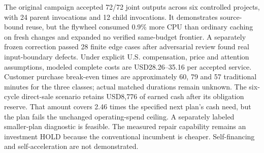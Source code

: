 The original campaign accepted 72/72 joint outputs across six controlled projects, with 24 parent invocations and 12 child invocations. It demonstrates source-bound reuse, but the flywheel consumed 0.9\% more CPU than ordinary caching on fresh changes and expanded no verified same-budget frontier. A separately frozen correction passed 28 finite edge cases after adversarial review found real input-boundary defects. Under explicit U.S. compensation, price and attention assumptions, modeled complete costs are USD28.26--35.16 per accepted service. Customer purchase break-even times are approximately 60, 79 and 57 traditional minutes for the three classes; actual matched durations remain unknown. The six-cycle direct-sale scenario retains USD8,776 of earned cash after its obligation reserve. That amount covers 2.46 times the specified next plan's cash need, but the plan fails the unchanged operating-spend ceiling. A separately labeled smaller-plan diagnostic is feasible. The measured repair capability remains an investment HOLD because the conventional incumbent is cheaper. Self-financing and self-acceleration are not demonstrated.
